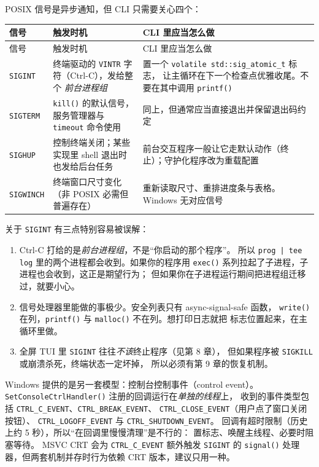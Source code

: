 \documentclass[12pt,a4paper,fontset=fandol]{ctexbook}
\newcommand{\Fn}[1]{\texttt{#1()}}
\newcommand{\Tp}[1]{\texttt{#1}}
\newcommand{\Bk}{\allowbreak}
\begin{document}
POSIX 信号是异步通知，但 CLI 只需要关心四个：

\begin{longtable}{@{}>{\raggedright\arraybackslash}p{}
                 >{\raggedright\arraybackslash}p{}
                 >{\raggedright\arraybackslash}p{}@{}}
\toprule
信号 & 触发时机 & CLI 里应当怎么做 \\
\midrule
\endfirsthead
\toprule
信号 & 触发时机 & CLI 里应当怎么做 \\
\midrule
\endhead
\Tp{SIGINT} & 终端驱动的 \Tp{VINTR} 字符（Ctrl-C），发给整个
\emph{前台进程组} & 置一个 \Tp{volatile std::sig\_atomic\_t} 标志，
让主循环在下一个检查点优雅收尾。不要在其中调用 \Fn{printf} \\
\Tp{SIGTERM} & \Fn{kill} 的默认信号，服务管理器与 \Tp{timeout} 命令使用 &
同上，但通常应当直接退出并保留退出码约定 \\
\Tp{SIGHUP} & 控制终端关闭；某些实现里 shell 退出时也发给后台任务 &
前台交互程序一般让它走默认动作（终止）；守护化程序改为重载配置 \\
\Tp{SIGWINCH} & 终端窗口尺寸变化（非 POSIX 必需但普遍存在） &
重新读取尺寸、重排进度条与表格。Windows 无对应信号 \\
\bottomrule
\end{longtable}

关于 \Tp{SIGINT} 有三点特别容易被误解：

\begin{enumerate}
\item Ctrl-C 打给的是\emph{前台进程组}，不是``你启动的那个程序''。
      所以 \Tp{prog | tee log} 里的两个进程都会收到。如果你的程序用
      \Fn{exec} 系列拉起了子进程，子进程也会收到，这正是期望行为；
      但如果你在子进程运行期间把进程组迁移过，就要小心。
\item 信号处理器里能做的事极少。安全列表只有 async-signal-safe 函数，
      \Fn{write} 在列，\Fn{printf} 与 \Fn{malloc} 不在列。想打印日志就把
      标志位置起来，在主循环里做。
\item 全屏 TUI 里 \Tp{SIGINT} 往往\emph{不该}终止程序（见第 8 章），
      但如果程序被 \Tp{SIGKILL} 或崩溃杀死，终端状态一定坏掉，
      所以必须有第 9 章的恢复机制。
\end{enumerate}

Windows 提供的是另一套模型：控制台控制事件（control event）。
\Fn{Set\Bk Console\Bk Ctrl\Bk Handler} 注册的回调运行在\emph{单独的线程}上，
收到的事件类型包括 \Tp{CTRL\_C\_EVENT}、\Tp{CTRL\_BREAK\_EVENT}、
\Tp{CTRL\_CLOSE\_EVENT}（用户点了窗口关闭按钮）、
\Tp{CTRL\_LOGOFF\_EVENT} 与 \Tp{CTRL\_SHUTDOWN\_EVENT}。
回调有超时限制（历史上约 5 秒），所以``在回调里慢慢清理''是不行的：
置标志、唤醒主线程、必要时阻塞等待。
MSVC CRT 会为 \Tp{CTRL\_C\_EVENT} 额外触发 \Tp{SIGINT} 的
\Fn{signal} 处理器，但两套机制并存时行为依赖 CRT 版本，建议只用一种。
\end{document}
